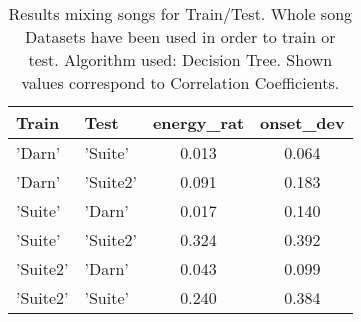 \begin{table}
\centering
\caption[Results mixing songs for Train/Test]{Results mixing songs for Train/Test. Whole song Datasets have been used in order to train or test. Algorithm used: Decision Tree. Shown values correspond to Correlation Coefficients.}
\label{tab:mixed_energy}
\footnotesize
\begin{tabular} {llcc}
\\ \hline
Train & Test & energy\_rat & onset\_dev	 \\ \hline
'Darn' & 'Suite' & 0.013 & 0.064 \\
'Darn' & 'Suite2' & 0.091 & 0.183 \\
'Suite' & 'Darn' & 0.017 & 0.140 \\
'Suite' & 'Suite2' &  0.324 & 0.392 \\
'Suite2' & 'Darn' & 0.043 & 0.099 \\
'Suite2' & 'Suite' & 0.240 &  0.384 \\
\hline
\end{tabular} 
\footnotesize

\end{table}
